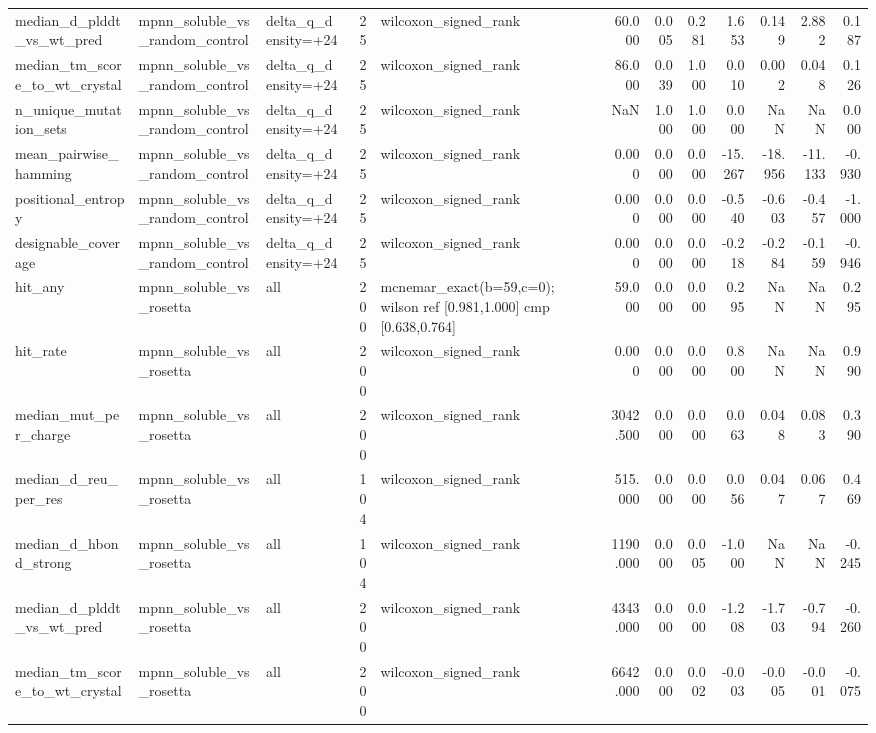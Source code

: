 \begin{table}
{\begin{tabular}{lllrlrrrrrrr}
median\_d\_plddt\_vs\_wt\_pred & mpnn\_soluble\_vs\_random\_control & delta\_q\_density=+24 & 25 & wilcoxon\_signed\_rank & 60.000 & 0.005 & 0.281 & 1.653 & 0.149 & 2.882 & 0.187 \\
median\_tm\_score\_to\_wt\_crystal & mpnn\_soluble\_vs\_random\_control & delta\_q\_density=+24 & 25 & wilcoxon\_signed\_rank & 86.000 & 0.039 & 1.000 & 0.010 & 0.002 & 0.048 & 0.126 \\
n\_unique\_mutation\_sets & mpnn\_soluble\_vs\_random\_control & delta\_q\_density=+24 & 25 & wilcoxon\_signed\_rank & NaN & 1.000 & 1.000 & 0.000 & NaN & NaN & 0.000 \\
mean\_pairwise\_hamming & mpnn\_soluble\_vs\_random\_control & delta\_q\_density=+24 & 25 & wilcoxon\_signed\_rank & 0.000 & 0.000 & 0.000 & -15.267 & -18.956 & -11.133 & -0.930 \\
positional\_entropy & mpnn\_soluble\_vs\_random\_control & delta\_q\_density=+24 & 25 & wilcoxon\_signed\_rank & 0.000 & 0.000 & 0.000 & -0.540 & -0.603 & -0.457 & -1.000 \\
designable\_coverage & mpnn\_soluble\_vs\_random\_control & delta\_q\_density=+24 & 25 & wilcoxon\_signed\_rank & 0.000 & 0.000 & 0.000 & -0.218 & -0.284 & -0.159 & -0.946 \\
hit\_any & mpnn\_soluble\_vs\_rosetta & all & 200 & mcnemar\_exact(b=59,c=0); wilson ref [0.981,1.000] cmp [0.638,0.764] & 59.000 & 0.000 & 0.000 & 0.295 & NaN & NaN & 0.295 \\
hit\_rate & mpnn\_soluble\_vs\_rosetta & all & 200 & wilcoxon\_signed\_rank & 0.000 & 0.000 & 0.000 & 0.800 & NaN & NaN & 0.990 \\
median\_mut\_per\_charge & mpnn\_soluble\_vs\_rosetta & all & 200 & wilcoxon\_signed\_rank & 3042.500 & 0.000 & 0.000 & 0.063 & 0.048 & 0.083 & 0.390 \\
median\_d\_reu\_per\_res & mpnn\_soluble\_vs\_rosetta & all & 104 & wilcoxon\_signed\_rank & 515.000 & 0.000 & 0.000 & 0.056 & 0.047 & 0.067 & 0.469 \\
median\_d\_hbond\_strong & mpnn\_soluble\_vs\_rosetta & all & 104 & wilcoxon\_signed\_rank & 1190.000 & 0.000 & 0.005 & -1.000 & NaN & NaN & -0.245 \\
median\_d\_plddt\_vs\_wt\_pred & mpnn\_soluble\_vs\_rosetta & all & 200 & wilcoxon\_signed\_rank & 4343.000 & 0.000 & 0.000 & -1.208 & -1.703 & -0.794 & -0.260 \\
median\_tm\_score\_to\_wt\_crystal & mpnn\_soluble\_vs\_rosetta & all & 200 & wilcoxon\_signed\_rank & 6642.000 & 0.000 & 0.002 & -0.003 & -0.005 & -0.001 & -0.075 \\

\end{tabular}}
\end{table}
